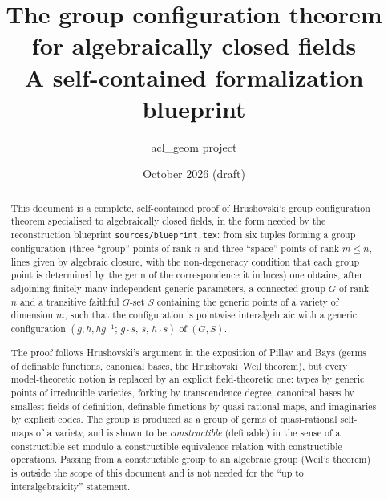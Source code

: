 \documentclass[11pt,oneside]{article}
\title{The group configuration theorem for algebraically closed fields\\[1ex]
\large A self-contained formalization blueprint}
\author{acl\_geom project}
\date{October 2026 (draft)}
\theoremstyle{definition}
\theoremstyle{remark}
\begin{document}
\maketitle

\begin{abstract}
This document is a complete, self-contained proof of Hrushovski's group configuration
theorem specialised to algebraically closed fields, in the form needed by the
reconstruction blueprint \texttt{sources/blueprint.tex}: from six tuples forming a
group configuration (three ``group'' points of rank $n$ and three ``space'' points
of rank $m\le n$, lines given by algebraic closure, with the non-degeneracy condition
that each group point is determined by the germ of the correspondence it induces)
one obtains, after adjoining finitely many independent generic parameters, a
connected group $G$ of rank $n$ and a transitive faithful $G$-set $S$ containing the
generic points of a variety of dimension $m$, such that the configuration is pointwise
interalgebraic with a generic configuration $(g,h,hg^{-1};\, g\cdot s,\, s,\, h\cdot s)$
of $(G,S)$.

The proof follows Hrushovski's argument in the exposition of Pillay and Bays
(germs of definable functions, canonical bases, the Hrushovski--Weil theorem),
but every model-theoretic notion is replaced by an explicit field-theoretic one:
types by generic points of irreducible varieties, forking by transcendence degree,
canonical bases by smallest fields of definition, definable functions by
quasi-rational maps, and imaginaries by explicit codes.  The group is produced as
a group of germs of quasi-rational self-maps of a variety, and is shown to be
\emph{constructible} (definable) in the sense of a constructible set modulo a
constructible equivalence relation with constructible operations.  Passing from a
constructible group to an algebraic group (Weil's theorem) is outside the scope of
this document and is not needed for the ``up to interalgebraicity'' statement.
\end{abstract}

\tableofcontents














\end{document}
